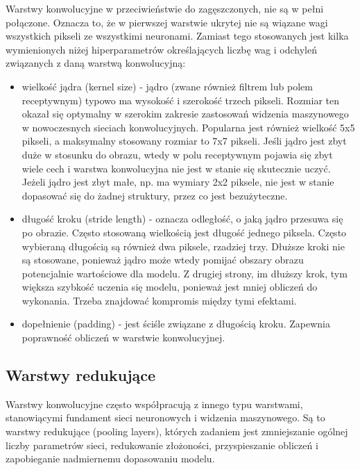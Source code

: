 \documentclass[12pt]{mwbk}
\theoremstyle{plain}
\theoremstyle{definition}
\theoremstyle{remark}
\begin{document}
Warstwy konwolucyjne w przeciwieństwie do zagęszczonych, nie są w pełni połączone. Oznacza to, że w pierwszej warstwie ukrytej nie są wiązane wagi wszystkich pikseli ze wszystkimi neuronami. Zamiast tego stosowanych jest kilka wymienionych niżej hiperparametrów określających liczbę wag i odchyleń związanych z daną warstwą konwolucyjną:
\begin{itemize}
	\item wielkość jądra (kernel size) - jądro (zwane również filtrem lub polem receptywnym) typowo ma wysokość i szerokość trzech pikseli. Rozmiar ten okazał się optymalny w szerokim zakresie zastosowań widzenia maszynowego w nowoczesnych sieciach konwolucyjnych. Popularna jest również wielkość 5x5 pikseli, a maksymalny stosowany rozmiar to 7x7 pikseli. Jeśli jądro jest zbyt duże w stosunku do obrazu, wtedy w polu receptywnym pojawia się zbyt wiele cech i warstwa konwolucyjna nie jest w stanie się skutecznie uczyć. Jeżeli jądro jest zbyt małe, np. ma wymiary 2x2 piksele, nie jest w stanie dopasować się do żadnej struktury, przez co jest bezużyteczne.
	
	\item długość kroku (stride length) - oznacza odległość, o jaką jądro przesuwa się po obrazie. Często stosowaną wielkością jest długość jednego piksela. Często wybieraną długością są również dwa piksele, rzadziej trzy. Dłuższe kroki nie są stosowane, ponieważ jądro może wtedy pomijać obszary obrazu potencjalnie wartościowe dla modelu. Z drugiej strony, im dłuższy krok, tym większa szybkość uczenia się modelu, ponieważ jest mniej obliczeń do wykonania. Trzeba znajdować kompromis między tymi efektami.
	
	\item dopełnienie (padding) - jest ściśle związane z długością kroku. Zapewnia poprawność obliczeń w warstwie konwolucyjnej.
	
\end{itemize}	
	
	\subsection{Warstwy redukujące}
	
	\cite{illustrated}
	
	Warstwy konwolucyjne często współpracują z innego typu warstwami, stanowiącymi fundament sieci neuronowych i widzenia maszynowego. Są to warstwy redukujące (pooling layers), których zadaniem jest zmniejszanie ogólnej liczby parametrów sieci, redukowanie złożoności, przyspieszanie obliczeń i zapobieganie nadmiernemu dopasowaniu modelu.
	
\end{document}
